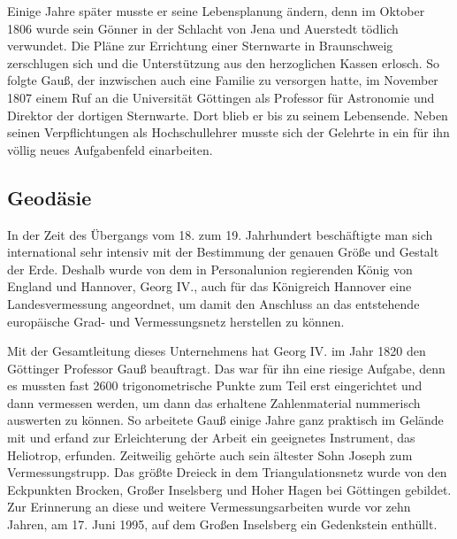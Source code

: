 \documentclass[10pt]{article}
\begin{document}
Einige Jahre später musste er seine Lebensplanung ändern, denn im Oktober 1806
wurde sein Gönner in der Schlacht von Jena und Auerstedt tödlich
verwundet. Die Pläne zur Errichtung einer Sternwarte in Braunschweig
zerschlugen sich und die Unterstützung aus den herzoglichen Kassen erlosch. So
folgte Gauß, der inzwischen auch eine Familie zu versorgen hatte, im November
1807 einem Ruf an die Universität Göttingen als Professor für Astronomie und
Direktor der dortigen Sternwarte. Dort blieb er bis zu seinem
Lebensende. Neben seinen Verpflichtungen als Hochschullehrer musste sich der
Gelehrte in ein für ihn völlig neues Aufgabenfeld einarbeiten.

\subsection{Geodäsie}

In der Zeit des Übergangs vom 18. zum 19. Jahrhundert beschäftigte man sich
international sehr intensiv mit der Bestimmung der genauen Größe und Gestalt
der Erde. Deshalb wurde von dem in Personalunion regierenden König von England
und Hannover, Georg IV., auch für das Königreich Hannover eine
Landesvermessung angeordnet, um damit den Anschluss an das entstehende
europäische Grad- und Vermessungsnetz herstellen zu können.

Mit der Gesamtleitung dieses Unternehmens hat Georg IV. im Jahr 1820 den
Göttinger Professor Gauß beauftragt. Das war für ihn eine riesige Aufgabe,
denn es mussten fast 2600 trigonometrische Punkte zum Teil erst eingerichtet
und dann vermessen werden, um dann das erhaltene Zahlenmaterial nummerisch
auswerten zu können. So arbeitete Gauß einige Jahre ganz praktisch im Gelände
mit und erfand zur Erleichterung der Arbeit ein geeignetes Instrument, das
Heliotrop, erfunden. Zeitweilig gehörte auch sein ältester Sohn Joseph zum
Vermessungstrupp. Das größte Dreieck in dem Triangulationsnetz wurde von den
Eckpunkten Brocken, Großer Inselsberg und Hoher Hagen bei Göttingen
gebildet. Zur Erinnerung an diese und weitere Vermessungsarbeiten wurde vor
zehn Jahren, am 17. Juni 1995, auf dem Großen Inselsberg ein Gedenkstein
enthüllt.\bigskip
\end{document}
